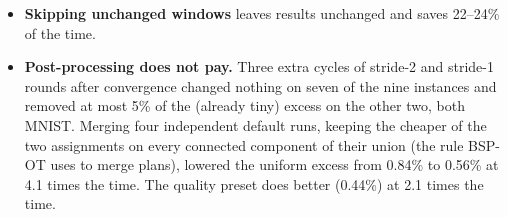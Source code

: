 \begin{itemize}
  2.1--3.4$\times$ faster on the clustered inputs but 1.04--1.3$\times$ slower on uniform
  points. The plain Hungarian method is up to 1.2$\times$ slower, and Jonker--Volgenant
  3--12$\times$ slower.
\item \textbf{Skipping unchanged windows} leaves results unchanged and saves 22--24\% of the time.
\item \textbf{Post-processing does not pay.} Three extra cycles of stride-2 and stride-1
  rounds after convergence changed nothing on seven of the nine instances and removed at
  most 5\% of the (already tiny) excess on the other two, both MNIST. Merging four
  independent default runs, keeping the cheaper of the two assignments on every connected
  component of their union (the rule BSP-OT uses to merge plans), lowered the uniform excess
  from 0.84\% to 0.56\% at 4.1 times the time. The quality preset does better (0.44\%) at 2.1
  times the time.
\end{itemize}
